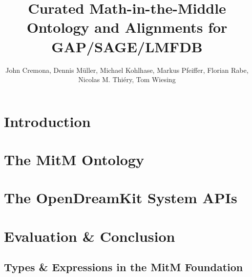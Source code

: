 \documentclass{deliverablereport}
\title{Curated Math-in-the-Middle Ontology and Alignments for GAP/SAGE/LMFDB}
\author{John Cremona, Dennis M\"uller, Michael Kohlhase, Markus Pfeiffer, Florian Rabe, Nicolas M. Thiéry, Tom Wiesing}
\begin{document}
\maketitle

\bigskip

\begin{abstract}\end{abstract}
\newpage\tableofcontents\newpage

\section{Introduction}\label{sec:intro}
\newpage

\section{The MitM Ontology}\label{sec:mitmonto}
\newpage

\section{The OpenDreamKit System APIs}\label{sec:sysapis}
\newpage

\section{Evaluation \& Conclusion}\label{sec:concl}
\newpage
\printbibliography\newpage

\begin{appendix}
  \section{Types \& Expressions in the MitM Foundation}\label{app:types}
  
  
\end{appendix}
\end{document}
